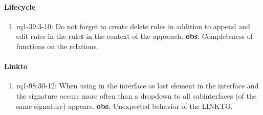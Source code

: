 \paragraph{Lifecycle}
\begin{enumerate}
    \item rq1-39:3-10: Do not forget to create delete rules in addition to append and edit rules in the {rule}\textbf{s} in the context of the  approach.
    \newline\textbf{obs}: Completeness of functions on the relations.

\end{enumerate}

\paragraph{Linkto}
\begin{enumerate}
    \item rq1-98:30-12: When using  in the {interface} as last element in the interface and the signature occurs more often than a dropdown to all subinterfaces (of the same signature) appears.
    \newline\textbf{obs}: Unexpected behavior of the LINKTO.
    

\end{enumerate}

